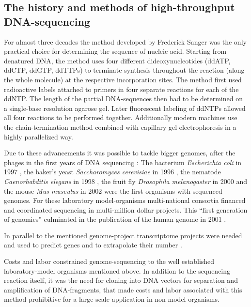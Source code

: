 \subsection{The history and methods of high-throughput DNA-sequencing}
\label{his-seq}

For almost three decades the method developed by Frederick Sanger
\cite{pmid271968} was the only practical choice for determining the
sequence of nucleic acid. Starting from denatured DNA, the method uses
four different dideoxynucleotides (ddATP, ddCTP, ddGTP, ddTTPs) to
terminate synthesis throughout the reaction (along the whole molecule)
at the respective incorporation sites.  The method first used
radioactive labels attached to primers in four separate reactions for
each of the ddNTP. The length of the partial DNA-sequences then had to
be determined on a single-base resolution agarose gel. Later
fluorescent labeling of ddNTPs allowed all four reactions to be
performed together. Additionally modern machines use the
chain-termination method combined with capillary gel electrophoresis
\cite{pmid2326186} in a highly parallelized way.

Due to these advancements it was possible to tackle bigger genomes,
after the phages in the first years of DNA sequencing
\cite{pmid1264203}: The bacterium \textit{Escherichia coli} in 1997
\cite{pmid9278503}, the baker's yeast \textit{Saccharomyces
  cerevisiae} in 1996 \cite{pmid8849441}, the nematode
\textit{Caenorhabditis elegans} in 1998 \cite{pmid9851916}, the fruit
fly \textit{Drosophila melanogaster} in 2000 \cite{adams2000genome}
and the mouse \textit{Mus musculus} in 2002 \cite{pmid12466850} were
the first organisms with sequenced genomes. For these laboratory
model-organisms multi-national consortia financed and coordinated
sequencing in multi-million dollar projects. This ``first generation
of genomics'' culminated in the publication of the human genome in
2001 \cite{pmid11181995}.

In parallel to the mentioned genome-project transcriptome projects
were needed and used to predict genes and to extrapolate their number
\cite{pmid7920649}.

Costs and labor constrained genome-sequencing to the well established
laboratory-model organisms mentioned above. In addition to the
sequencing reaction itself, it was the need for cloning into DNA
vectors for separation and amplification of DNA-fragments, that made
costs and labor associated with this method prohibitive for a large
scale application in non-model organisms.

